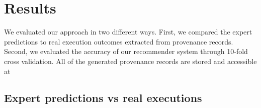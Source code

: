 \documentclass[conference]{IEEEtran}
\begin{document}





\section{Results}

We evaluated our approach in two different ways. First, 
we compared the expert predictions to 
real execution outcomes extracted from provenance records.
Second, we evaluated 
the accuracy of our recommender system through 10-fold cross validation. All of the generated provenance records are stored and accessible at~\cite{provenanceRecords}

\subsection{Expert predictions vs real executions}

\end{document}
